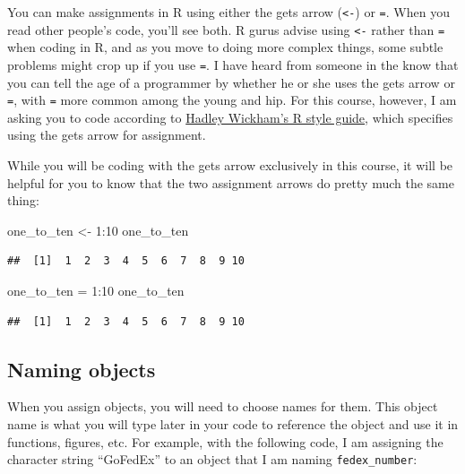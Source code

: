 \documentclass[]{book}
\makeatletter
\newenvironment{Shaded}{\begin{snugshade}}{\end{snugshade}}
\newcommand{\DecValTok}[1]{\textcolor[rgb]{0.00,0.00,0.81}{{#1}}}
\newcommand{\StringTok}[1]{\textcolor[rgb]{0.31,0.60,0.02}{{#1}}}
\newcommand{\NormalTok}[1]{{#1}}
\newenvironment{kframe}{%
\medskip{}
\setlength{\fboxsep}{.8em}
 \def\at@end@of@kframe{}%
 \ifinner\ifhmode%
  \def\at@end@of@kframe{\end{minipage}}%
  \begin{minipage}{\columnwidth}%
 \fi\fi%
 \def\FrameCommand##1{\hskip\@totalleftmargin \hskip-\fboxsep
 \colorbox{shadecolor}{##1}\hskip-\fboxsep
     \hskip-\linewidth \hskip-\@totalleftmargin \hskip\columnwidth}%
 \MakeFramed {\advance\hsize-\width
   \@totalleftmargin\z@ \linewidth\hsize
   \@setminipage}}%
 {\par\unskip\endMakeFramed%
 \at@end@of@kframe}
\renewenvironment{Shaded}{\begin{kframe}}{\end{kframe}}
\makeatother
\begin{document}
You can make assignments in R using either the gets arrow
(\texttt{\textless{}-}) or \texttt{=}. When you read other people's
code, you'll see both. R gurus advise using \texttt{\textless{}-} rather
than \texttt{=} when coding in R, and as you move to doing more complex
things, some subtle problems might crop up if you use \texttt{=}. I have
heard from someone in the know that you can tell the age of a programmer
by whether he or she uses the gets arrow or \texttt{=}, with \texttt{=}
more common among the young and hip. For this course, however, I am
asking you to code according to
\href{http://adv-r.had.co.nz/Style.html}{Hadley Wickham's R style
guide}, which specifies using the gets arrow for assignment.

While you will be coding with the gets arrow exclusively in this course,
it will be helpful for you to know that the two assignment arrows do
pretty much the same thing:

\begin{Shaded}
\begin{Highlighting}[]
\NormalTok{one_to_ten <-}\StringTok{ }\DecValTok{1}\NormalTok{:}\DecValTok{10}
\NormalTok{one_to_ten}
\end{Highlighting}
\end{Shaded}

\begin{verbatim}
##  [1]  1  2  3  4  5  6  7  8  9 10
\end{verbatim}

\begin{Shaded}
\begin{Highlighting}[]
\NormalTok{one_to_ten =}\StringTok{ }\DecValTok{1}\NormalTok{:}\DecValTok{10}
\NormalTok{one_to_ten}
\end{Highlighting}
\end{Shaded}

\begin{verbatim}
##  [1]  1  2  3  4  5  6  7  8  9 10
\end{verbatim}

\subsection{Naming objects}\label{naming-objects}

When you assign objects, you will need to choose names for them. This
object name is what you will type later in your code to reference the
object and use it in functions, figures, etc. For example, with the
following code, I am assigning the character string ``GoFedEx'' to an
object that I am naming \texttt{fedex\_number}:
\end{document}
